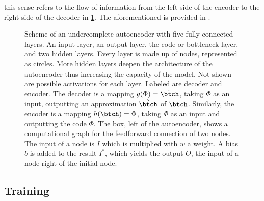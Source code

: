 this sense refers to the flow of information from the left side of the encoder to the right side of the decoder in \cref{Fig:Autoencoder}. The aforementioned is provided in \cite{Goodfellow}.\\
\begin{figure}
	\centering
	
	\caption{\footnotesize Scheme of an undercomplete autoencoder with five fully connected layers. An input layer, an output layer, the code or bottleneck layer, and two hidden layers. Every layer is made up of nodes, represented as circles. More hidden layers deepen the architecture of the autoencoder thus increasing the capacity of the model. Not shown are possible activations for each layer. Labeled are decoder and encoder. The decoder is a mapping \(g(\Phi)=\tilde{\btch}\), taking \(\Phi\) as an input, outputting an approximation \(\tilde{\btch}\) of \(\btch\). Similarly, the encoder is a mapping \(h(\btch)=\Phi\), taking \(\Phi\) as an input and outputting the code \(\Phi\). The box, left of the autoencoder, shows a computational graph for the feedforward connection of two nodes. The input of a node is \(I\) which is multiplied with \(w\) a weight. A bias \(b\) is added to the result \(I^*\), which yields the output \(O\), the input of a node right of the initial node.}
	\label{Fig:Autoencoder}
\end{figure}
\subsection{Training}

